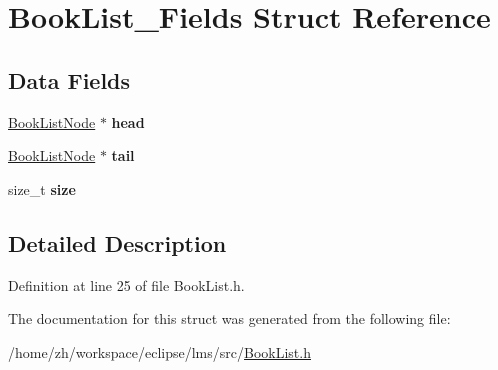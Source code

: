 \hypertarget{structBookList__Fields}{\section{Book\-List\-\_\-\-Fields Struct Reference}
\label{structBookList__Fields}
}
\subsection*{Data Fields}
\begin{DoxyCompactItemize}
\item 
\hypertarget{structBookList__Fields_ac904f47f02e1ed605944a8b19cdcb188}{\hyperlink{structBookListNode}{Book\-List\-Node} $\ast$ {\bfseries head}}\label{structBookList__Fields_ac904f47f02e1ed605944a8b19cdcb188}

\item 
\hypertarget{structBookList__Fields_a34d8d0adb67f424709fbaa3bab298620}{\hyperlink{structBookListNode}{Book\-List\-Node} $\ast$ {\bfseries tail}}\label{structBookList__Fields_a34d8d0adb67f424709fbaa3bab298620}

\item 
\hypertarget{structBookList__Fields_aa0ef7d99f4594b2c17209c3a7332da53}{size\-\_\-t {\bfseries size}}\label{structBookList__Fields_aa0ef7d99f4594b2c17209c3a7332da53}

\end{DoxyCompactItemize}


\subsection{Detailed Description}


Definition at line 25 of file Book\-List.\-h.



The documentation for this struct was generated from the following file\-:\begin{DoxyCompactItemize}
\item 
/home/zh/workspace/eclipse/lms/src/\hyperlink{BookList_8h}{Book\-List.\-h}\end{DoxyCompactItemize}
